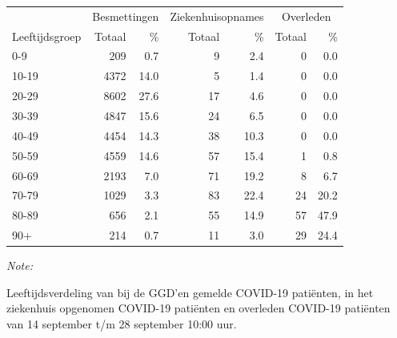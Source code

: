 \documentclass[
  english,
  man,floatsintext]{apa6}
\begin{document}
\begin{table}[H]
\centering\begingroup\fontsize{11}{13}\selectfont

\begin{threeparttable}
\begin{tabular}{lrrrrrr}
\toprule
\multicolumn{1}{c}{ } & \multicolumn{2}{c}{Besmettingen} & \multicolumn{2}{c}{Ziekenhuisopnames} & \multicolumn{2}{c}{Overleden} \\
\cmidrule(l{3pt}r{3pt}){2-3} \cmidrule(l{3pt}r{3pt}){4-5} \cmidrule(l{3pt}r{3pt}){6-7}
Leeftijdsgroep & Totaal & \% & Totaal & \% & Totaal & \%\\
\midrule
0-9 & 209 & 0.7 & 9 & 2.4 & 0 & 0.0\\
10-19 & 4372 & 14.0 & 5 & 1.4 & 0 & 0.0\\
20-29 & 8602 & 27.6 & 17 & 4.6 & 0 & 0.0\\
30-39 & 4847 & 15.6 & 24 & 6.5 & 0 & 0.0\\
40-49 & 4454 & 14.3 & 38 & 10.3 & 0 & 0.0\\
50-59 & 4559 & 14.6 & 57 & 15.4 & 1 & 0.8\\
60-69 & 2193 & 7.0 & 71 & 19.2 & 8 & 6.7\\
70-79 & 1029 & 3.3 & 83 & 22.4 & 24 & 20.2\\
80-89 & 656 & 2.1 & 55 & 14.9 & 57 & 47.9\\
90+ & 214 & 0.7 & 11 & 3.0 & 29 & 24.4\\
\bottomrule
\end{tabular}
\begin{tablenotes}
\item \textit{Note: } 
\item Leeftijdsverdeling van bij de GGD’en gemelde COVID-19 patiënten, in het ziekenhuis opgenomen COVID-19 patiënten en overleden COVID-19 patiënten van 14 september t/m 28 september 10:00 uur.
\end{tablenotes}
\end{threeparttable}
\endgroup{}
\end{table}
\end{document}

